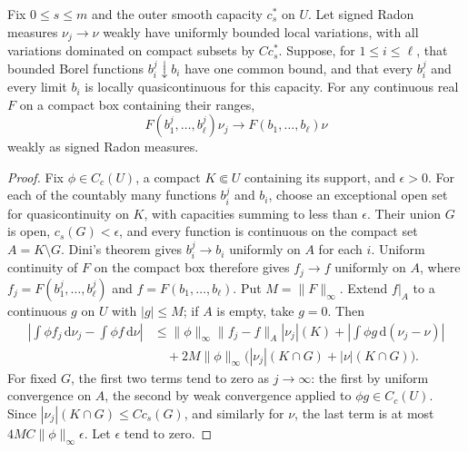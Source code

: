 \begin{lemma}\label{hessian:weighted-measure-convergence}
Fix $0\leq s\leq m$ and the outer smooth capacity $c_s^*$ on $U$.
Let signed Radon measures $\nu_j\to\nu$ weakly have uniformly bounded
local variations, with all variations dominated on compact subsets
by $C c_s^*$. Suppose, for $1\leq i\leq\ell$, that bounded Borel
functions $b_i^j\downarrow b_i$ have one common bound, and that every
$b_i^j$ and every limit $b_i$ is locally quasicontinuous for this
capacity. For any continuous real $F$ on a compact box containing
their ranges,
\[
 F(b_1^j,\ldots,b_\ell^j)\nu_j
       \longrightarrow F(b_1,\ldots,b_\ell)\nu
\]
weakly as signed Radon measures.
\end{lemma}
\begin{proof}
Fix $\phi\in C_c(U)$, a compact $K\Subset U$ containing its
support, and $\epsilon>0$. For each of the countably many functions
$b_i^j$ and $b_i$, choose an exceptional open set for
quasicontinuity on $K$, with capacities summing to less than
$\epsilon$. Their union $G$ is open, $c_s(G)<\epsilon$, and every
function is continuous on the compact set $A=K\setminus G$.
Dini's theorem gives $b_i^j\to b_i$ uniformly on $A$ for each $i$.
Uniform continuity of $F$ on the compact box therefore gives
$f_j\to f$ uniformly on $A$, where
$f_j=F(b_1^j,\ldots,b_\ell^j)$ and $f=F(b_1,\ldots,b_\ell)$.
Put $M=\|F\|_\infty$. Extend $f|_A$ to a continuous $g$ on $U$
with $|g|\leq M$; if $A$ is empty, take $g=0$.
Then
\[
\begin{aligned}
 \left|\int\phi f_j\,\mathrm d\nu_j-
                 \int\phi f\,\mathrm d\nu\right|
 &\leq \|\phi\|_\infty\|f_j-f\|_A|\nu_j|(K)
       +\left|\int\phi g\,\mathrm d(\nu_j-\nu)\right|\\
 &\quad+2M\|\phi\|_\infty
            \bigl(|\nu_j|(K\cap G)+|\nu|(K\cap G)\bigr).
\end{aligned}
\]
For fixed $G$, the first two terms tend to zero as $j\to\infty$:
the first by uniform convergence on $A$, the second by weak
convergence applied to $\phi g\in C_c(U)$. Since
$|\nu_j|(K\cap G)\leq Cc_s(G)$, and similarly for $\nu$, the last
term is at most $4MC\|\phi\|_\infty\epsilon$. Let $\epsilon$ tend
to zero.
\end{proof}

